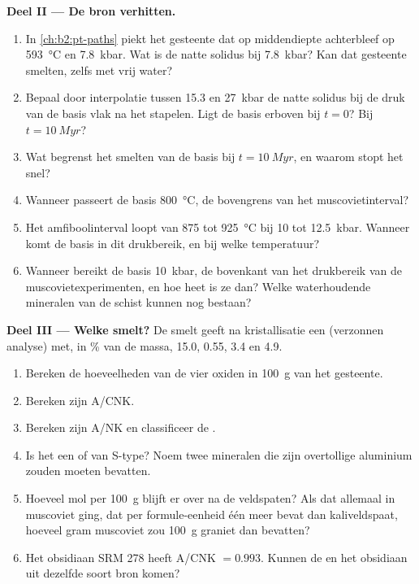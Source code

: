 \begin{problem}
\noindent\textbf{Deel II --- De bron verhitten.}
\begin{enumerate}[resume]
\item In \cref{ch:b2:pt-paths} piekt het gesteente dat op middendiepte achterbleef op \qty{593}{\celsius}
en \qty{7.8}{kbar}. Wat is de natte solidus bij \qty{7.8}{kbar}? Kan dat gesteente smelten, zelfs
met vrij water?
\item Bepaal door interpolatie tussen 15.3 en \qty{27}{kbar} de natte solidus bij de druk
van de basis vlak na het stapelen. Ligt de basis erboven bij $t = 0$? Bij $t = \qty{10}{Myr}$?
\item Wat begrenst het smelten van de basis bij $t = \qty{10}{Myr}$, en waarom stopt het
snel?
\item Wanneer passeert de basis \qty{800}{\celsius}, de bovengrens van het
muscovietinterval?
\item Het amfiboolinterval loopt van 875 tot \qty{925}{\celsius} bij 10 tot \qty{12.5}{kbar}.
Wanneer komt de basis in dit drukbereik, en bij welke temperatuur?
\item Wanneer bereikt de basis \qty{10}{kbar}, de bovenkant van het drukbereik van de
muscovietexperimenten, en hoe heet is ze dan? Welke waterhoudende mineralen van de schist kunnen
nog bestaan?
\end{enumerate}

\noindent\textbf{Deel III --- Welke smelt?}
De smelt geeft na kristallisatie een  (verzonnen analyse) met, in
\unit{\percent} van de massa,  15.0,  0.55,  3.4 en  4.9.
\begin{enumerate}[resume]
\item Bereken de hoeveelheden van de vier oxiden in \qty{100}{\gram} van het gesteente.
\item Bereken zijn A/CNK.
\item Bereken zijn A/NK en classificeer de .
\item Is het een  of van S-type? Noem twee mineralen die zijn overtollige
aluminium zouden moeten bevatten.
\item Hoeveel mol  per \qty{100}{\gram} blijft er over na de
veldspaten? Als dat allemaal in muscoviet ging, dat per formule-eenheid één  meer
bevat dan kaliveldspaat, hoeveel gram muscoviet zou \qty{100}{\gram} graniet dan
bevatten?
\item Het obsidiaan SRM 278 heeft A/CNK $= 0.993$. Kunnen de  en het obsidiaan
uit dezelfde soort bron komen?
\end{enumerate}


\end{problem}
